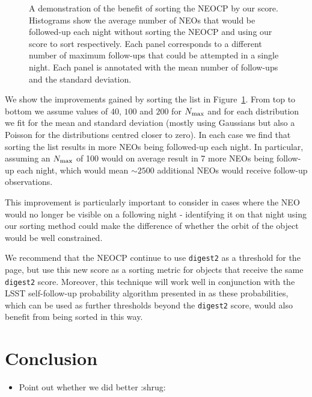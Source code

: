 \documentclass[twocolumn, twocolappendix]{aastex631}
\newcommand{\dig}{\texttt{digest2}}
\begin{document}
\begin{figure}[htb]
    \caption{A demonstration of the benefit of sorting the NEOCP by our score. Histograms show the average number of NEOs that would be followed-up each night without sorting the NEOCP and using our score to sort respectively. Each panel corresponds to a different number of maximum follow-ups that could be attempted in a single night. Each panel is annotated with the mean number of follow-ups and the standard deviation.}
    \label{fig:sort_by_score}
\end{figure}

We show the improvements gained by sorting the list in Figure~\ref{fig:sort_by_score}. From top to bottom we assume values of $40$, $100$ and $200$ for $N_{\rm max}$ and for each distribution we fit for the mean and standard deviation (mostly using Gaussians but also a Poisson for the distributions centred closer to zero). In each case we find that sorting the list results in more NEOs being followed-up each night. In particular, assuming an $N_{\rm max}$ of 100 would on average result in 7 more NEOs being follow-up each night, which would mean ${\sim}2500$ additional NEOs would receive follow-up observations.

This improvement is particularly important to consider in cases where the NEO would no longer be visible on a following night - identifying it on that night using our sorting method could make the difference of whether the orbit of the object would be well constrained.

We recommend that the NEOCP continue to use \dig{} as a threshold for the page, but use this new score as a sorting metric for objects that receive the same \dig{} score. Moreover, this technique will work well in conjunction with the LSST self-follow-up probability algorithm presented in \citep{sky-is-falling} as these probabilities, which can be used as further thresholds beyond the \dig{} score, would also benefit from being sorted in this way.

\section{Conclusion}

\begin{itemize}
    \item Point out whether we did better :shrug:
\end{itemize}


{}

\clearpage
\end{document}
